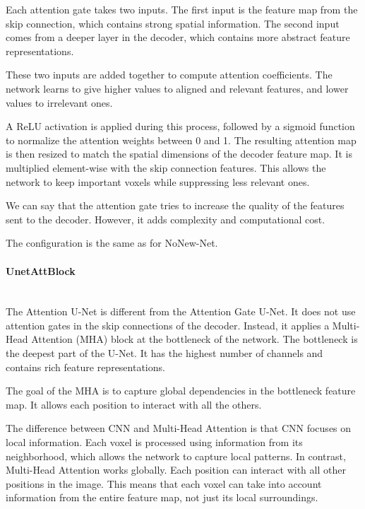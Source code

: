 \documentclass[12pt]{article}
\begin{document}
Each attention gate takes two inputs. 
The first input is the feature map from the skip connection, which contains strong spatial information.
The second input comes from a deeper layer in the decoder, which contains more abstract feature representations.
\vspace{0.5cm}

These two inputs are added together to compute attention coefficients. 
The network learns to give higher values to aligned and relevant features, and lower values to irrelevant ones.
\vspace{0.5cm}

A ReLU activation is applied during this process, followed by a sigmoid function to normalize the attention weights between 0 and 1.
The resulting attention map is then resized to match the spatial dimensions of the decoder feature map.
It is multiplied element-wise with the skip connection features.
This allows the network to keep important voxels while suppressing less relevant ones.
\vspace{0.5cm}

We can say that the attention gate tries to increase the quality of the features sent to the decoder.
However, it adds complexity and computational cost.
\vspace{0.5cm}

The configuration is the same as for NoNew-Net.

\paragraph{UnetAttBlock}
\mbox{}\\

The Attention U-Net is different from the Attention Gate U-Net. 
It does not use attention gates in the skip connections of the decoder. 
Instead, it applies a Multi-Head Attention (MHA) block at the bottleneck of the network.
The bottleneck is the deepest part of the U-Net. 
It has the highest number of channels and contains rich feature representations.
\vspace{0.5cm}

The goal of the MHA is to capture global dependencies in the bottleneck feature map.
It allows each position to interact with all the others.
\vspace{0.5cm}

The difference between CNN and Multi-Head Attention is that CNN focuses on local information. Each voxel is processed using information from its neighborhood, which allows the network to capture local patterns.
In contrast, Multi-Head Attention works globally.
Each position can interact with all other positions in the image.
This means that each voxel can take into account information from the entire feature map, not just its local surroundings.
\vspace{0.5cm}
\end{document}
